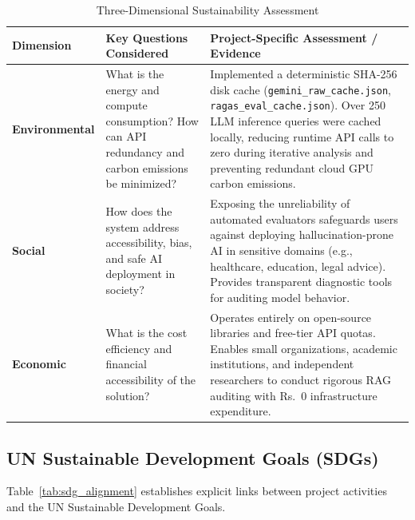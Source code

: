 \documentclass[11pt,a4paper]{article}
\renewcommand{\arraystretch}{1.2}
\begin{document}
\begin{table}[htbp]
\centering
\caption{Three-Dimensional Sustainability Assessment}
\label{tab:sustainability}
\footnotesize
\renewcommand{\arraystretch}{1.25}
\begin{tabularx}{\linewidth}{|>{\RaggedRight\bfseries}p{2.6cm}|>{\RaggedRight}p{4.2cm}|>{\RaggedRight}X|}
\hline
\rowcolor{tableheader}
Dimension & Key Questions Considered & Project-Specific Assessment / Evidence \\
\hline
\textbf{Environmental} & What is the energy and compute consumption? How can API redundancy and carbon emissions be minimized? & Implemented a deterministic SHA-256 disk cache (\texttt{gemini\_raw\_cache.json}, \texttt{ragas\_eval\_cache.json}). Over 250 LLM inference queries were cached locally, reducing runtime API calls to zero during iterative analysis and preventing redundant cloud GPU carbon emissions. \\
\hline
\textbf{Social} & How does the system address accessibility, bias, and safe AI deployment in society? & Exposing the unreliability of automated evaluators safeguards users against deploying hallucination-prone AI in sensitive domains (e.g., healthcare, education, legal advice). Provides transparent diagnostic tools for auditing model behavior. \\
\hline
\textbf{Economic} & What is the cost efficiency and financial accessibility of the solution? & Operates entirely on open-source libraries and free-tier API quotas. Enables small organizations, academic institutions, and independent researchers to conduct rigorous RAG auditing with Rs.~0 infrastructure expenditure. \\
\hline
\end{tabularx}
\end{table}

\subsection{UN Sustainable Development Goals (SDGs)}
Table~\ref{tab:sdg_alignment} establishes explicit links between project activities and the UN Sustainable Development Goals.
\end{document}
